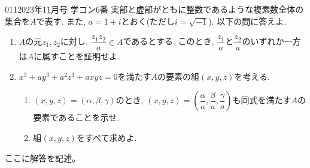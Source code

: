 \begin{prob}{011}{}{2023年11月号 学コン6番}
 実部と虚部がともに整数であるような複素数全体の集合を$A$で表す. また, $a=1+i$とおく(ただし$i=\sqrt{-1}$). 以下の問に答えよ.
 \begin{enumerate}
  \item $A$の元$z_1,z_2$に対し, $\dfrac{z_1z_2}{a}\in A$であるとする. このとき, $\dfrac{z_1}{a}$と$\dfrac{z_2}{a}$のいずれか一方は$A$に属すことを証明せよ.
  \item $x^3 + ay^3 + a^2 z^3 + axyz = 0$を満たす$A$の要素の組$(x,y,z)$を考える.
  \begin{enumerate}
   \item $(x,y,z)=(\alpha,\beta,\gamma)$のとき, $(x,y,z)=(\dfrac{\alpha}{a},\dfrac{\beta}{a},\dfrac{\gamma}{a})$も同式を満たす$A$の要素であることを示せ.
   \item 組$(x,y,z)$をすべて求めよ.
  \end{enumerate}
 \end{enumerate}
\end{prob}

ここに解答を記述。
